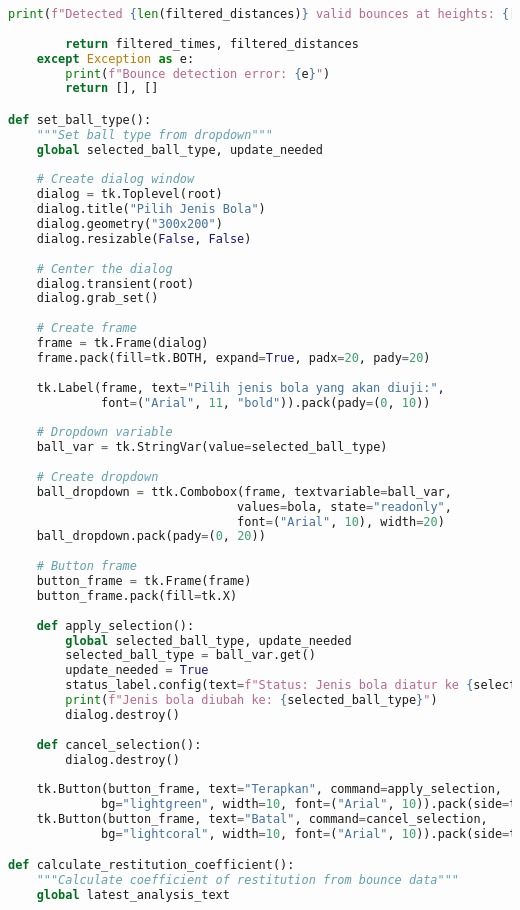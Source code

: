 \begin{itemize}
\begin{scriptsize}
\begin{lstlisting}[language=python]
        print(f"Detected {len(filtered_distances)} valid bounces at heights: {[round(h, 1) for h in filtered_distances]}")
        
        return filtered_times, filtered_distances
    except Exception as e:
        print(f"Bounce detection error: {e}")
        return [], []

def set_ball_type():
    """Set ball type from dropdown"""
    global selected_ball_type, update_needed
    
    # Create dialog window
    dialog = tk.Toplevel(root)
    dialog.title("Pilih Jenis Bola")
    dialog.geometry("300x200")
    dialog.resizable(False, False)
    
    # Center the dialog
    dialog.transient(root)
    dialog.grab_set()
    
    # Create frame
    frame = tk.Frame(dialog)
    frame.pack(fill=tk.BOTH, expand=True, padx=20, pady=20)
    
    tk.Label(frame, text="Pilih jenis bola yang akan diuji:", 
             font=("Arial", 11, "bold")).pack(pady=(0, 10))
    
    # Dropdown variable
    ball_var = tk.StringVar(value=selected_ball_type)
    
    # Create dropdown
    ball_dropdown = ttk.Combobox(frame, textvariable=ball_var, 
                                values=bola, state="readonly", 
                                font=("Arial", 10), width=20)
    ball_dropdown.pack(pady=(0, 20))
    
    # Button frame
    button_frame = tk.Frame(frame)
    button_frame.pack(fill=tk.X)
    
    def apply_selection():
        global selected_ball_type, update_needed
        selected_ball_type = ball_var.get()
        update_needed = True
        status_label.config(text=f"Status: Jenis bola diatur ke {selected_ball_type}", fg="blue")
        print(f"Jenis bola diubah ke: {selected_ball_type}")
        dialog.destroy()
    
    def cancel_selection():
        dialog.destroy()
    
    tk.Button(button_frame, text="Terapkan", command=apply_selection, 
             bg="lightgreen", width=10, font=("Arial", 10)).pack(side=tk.LEFT, padx=(0, 10))
    tk.Button(button_frame, text="Batal", command=cancel_selection, 
             bg="lightcoral", width=10, font=("Arial", 10)).pack(side=tk.LEFT)

def calculate_restitution_coefficient():
    """Calculate coefficient of restitution from bounce data"""
    global latest_analysis_text
    

\end{lstlisting}
\end{scriptsize}
\end{itemize}
